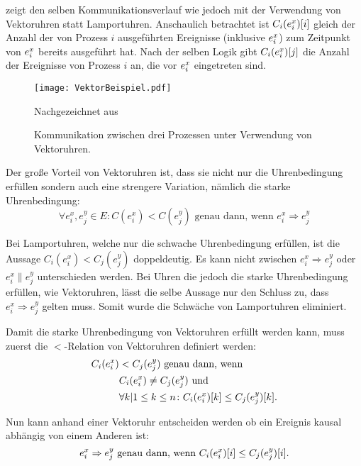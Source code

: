  zeigt den selben Kommunikationsverlauf wie  jedoch mit der Verwendung von Vektoruhren statt Lamportuhren.
Anschaulich betrachtet ist $C_i(e_i^x)[i]$ gleich der Anzahl der von Prozess $i$ ausgeführten Ereignisse (inklusive $e_i^x$) zum Zeitpunkt von $e_i^x$ bereits ausgeführt hat.
Nach der selben Logik gibt $C_i(e_i^x)[j]$ die Anzahl der Ereignisse von Prozess $i$ an, die vor $e_i^x$ eingetreten sind.

\begin{figure}[ht]
    \centering
    \texttt{[image: VektorBeispiel.pdf]}
    \caption[Exemplarische Kommunikation mit Vektoruhren]{Kommunikation zwischen drei Prozessen unter Verwendung von Vektoruhren.}
    Nachgezeichnet aus  \cite{landes2006dynamic}
    \label{fig:VektorBsp}
\end{figure}

Der große Vorteil von Vektoruhren ist, dass sie nicht nur die Uhrenbedingung erfüllen sondern auch eine strengere Variation, nämlich die starke Uhrenbedingung:
\begin{equation*}
\forall e_i^x, e_j^y \in E \colon C(e_i^x) < C(e_j^y) \text{ genau dann, wenn } e_i^x \Rightarrow e_j^y
\end{equation*}

Bei Lamportuhren, welche nur die schwache Uhrenbedingung erfüllen, ist die Aussage $C_i(e_i^x)<C_j(e_j^y)$ doppeldeutig. 
Es kann nicht zwischen $e_i^x \Rightarrow e_j^y$ oder $e_i^x \parallel e_j^y$ unterschieden werden.
Bei Uhren die jedoch die starke Uhrenbedingung erfüllen, wie Vektoruhren, lässt die selbe Aussage nur den Schluss zu, dass $e_i^x \Rightarrow e_j^y$ gelten muss.
Somit wurde die Schwäche von Lamportuhren eliminiert.

Damit die starke Uhrenbedingung von Vektoruhren erfüllt werden kann, muss zuerst die $<$-Relation von Vektoruhren definiert werden:
\begin{align*}
C_i(e_i^x) &< C_j(e_j^y) \text{ genau dann, wenn} \\
       & C_i(e_i^x) \ne C_j(e_j^y) \text{ und } \\
       & \forall k | 1 \leq k \leq n \colon C_i(e_i^x)[k] \leq C_j(e_j^y)[k].
\end{align*}

Nun kann anhand einer Vektoruhr entscheiden werden ob ein Ereignis kausal abhängig von einem Anderen ist:
\begin{equation*}
    e_i^x \Rightarrow e_j^y \text{ genau dann, wenn } C_i(e_i^x)[i] \leq C_j(e_j^y)[i].
\end{equation*}

